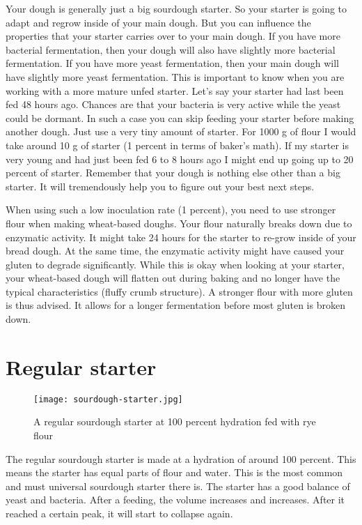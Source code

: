 Your dough is generally just a big sourdough starter. So your starter is going
to adapt and regrow inside of your main dough. But you can influence the
properties that your starter carries over to your main dough. If you have more
bacterial fermentation, then your dough will also have slightly more bacterial
fermentation. If you have more yeast fermentation, then your main dough will
have slightly more yeast fermentation. This is important to know when you are
working with a more mature unfed starter. Let's say your starter had last been
fed 48 hours ago. Chances are that your bacteria is very active while the
yeast could be dormant. In such a case you can skip feeding your starter
before making another dough. Just use a very tiny amount of starter. For 1000 g
of flour I would take around 10 g of starter (1 percent in terms of baker's
math). If my starter is very young and had just been fed 6 to 8 hours ago I might
end up going up to 20 percent of starter. Remember that your dough is nothing
else other than a big starter. It will tremendously help you to figure out
your best next steps.

When using such a low inoculation rate (1 percent), you need to use stronger
flour when making wheat-based doughs. Your flour naturally breaks down due
to enzymatic activity. It might take 24 hours for the starter to re-grow
inside of your bread dough. At the same time, the enzymatic activity might
have caused your gluten to degrade significantly. While this is okay
when looking at your starter, your wheat-based dough will flatten
out during baking and no longer have the typical characteristics (fluffy crumb
structure). A stronger flour with more gluten is thus advised. It allows for
a longer fermentation before most gluten is broken down.

\section{Regular starter}

\begin{figure}[!htb]
  \texttt{[image: sourdough-starter.jpg]}
  \caption{A regular sourdough starter at 100 percent hydration fed with rye flour}
  \label{fig:regular-sourdough-starter}
\end{figure}

The regular sourdough starter is made at a hydration of around 100 percent.
This means the starter has equal parts of flour and water. This is the most
common and must universal sourdough starter there is. The starter has a good
balance of yeast and bacteria. After a feeding, the volume increases and
increases. After it reached a certain peak, it will start to collapse again.

